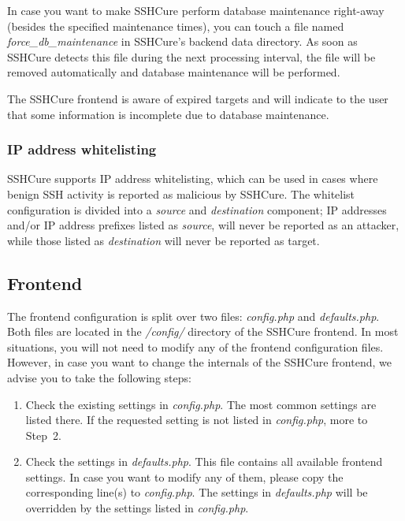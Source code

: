 In case you want to make SSHCure perform database maintenance right-away (besides the specified maintenance times), you can touch a file named \textit{force\_db\_maintenance} in SSHCure's backend data directory. As soon as SSHCure detects this file during the next processing interval, the file will be removed automatically and database maintenance will be performed.

The SSHCure frontend is aware of expired targets and will indicate to the user that some information is incomplete due to database maintenance.

\subsubsection{IP address whitelisting}

SSHCure supports IP address whitelisting, which can be used in cases where benign SSH activity is reported as malicious by SSHCure. The whitelist configuration is divided into a \textit{source} and \textit{destination} component; IP addresses and/or IP address prefixes listed as \textit{source}, will never be reported as an attacker, while those listed as \textit{destination} will never be reported as target.

\subsection{Frontend} \label{subsec:frontend_configuration}

The frontend configuration is split over two files: \textit{config.php} and \textit{defaults.php}. Both files are located in the \textit{/config/} directory of the SSHCure frontend. In most situations, you will not need to modify any of the frontend configuration files. However, in case you want to change the internals of the SSHCure frontend, we advise you to take the following steps:

\begin{enumerate}
	\item Check the existing settings in \textit{config.php}. The most common settings are listed there. If the requested setting is not listed in \textit{config.php}, more to Step~2.
	
	\item Check the settings in \textit{defaults.php}. This file contains all available frontend settings. In case you want to modify any of them, please copy the corresponding line(s) to \textit{config.php}. The settings in \textit{defaults.php} will be overridden by the settings listed in \textit{config.php}.

\end{enumerate}

